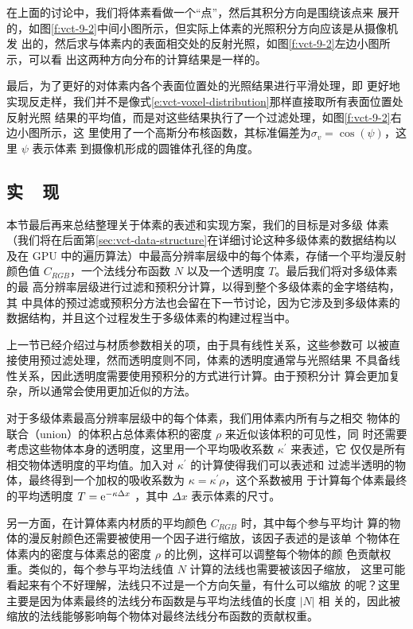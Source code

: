 在上面的讨论中，我们将体素看做一个“点”，然后其积分方向是围绕该点来 展开的，如图\ref{f:vct-9-2}中间小图所示，但实际上体素的光照积分方向应该是从摄像机发 出的，然后求与体素内的表面相交处的反射光照，如图\ref{f:vct-9-2}左边小图所示，可以看 出这两种方向分布的计算结果是一样的。

最后，为了更好的对体素内各个表面位置处的光照结果进行平滑处理，即 更好地实现反走样，我们并不是像式\ref{e:vct-voxel-distribution}那样直接取所有表面位置处反射光照 结果的平均值，而是对这些结果执行了一个过滤处理，如图\ref{f:vct-9-2}右边小图所示，这 里使用了一个高斯分布核函数，其标准偏差为$\sigma_v= \cos(\psi)$，这里 $\psi$ 表示体素 到摄像机形成的圆锥体孔径的角度。




\subsection{实~~现}\label{sec:vct-implementation}
本节最后再来总结整理关于体素的表述和实现方案，我们的目标是对多级 体素（我们将在后面第\ref{sec:vct-data-structure}在详细讨论这种多级体素的数据结构以及在 GPU 中的遍历算法）中最高分辨率层级中的每个体素，存储一个平均漫反射颜色值 $C_{RGB}$，一个法线分布函数 $N$ 以及一个透明度 $T$。最后我们将对多级体素的最 高分辨率层级进行过滤和预积分计算，以得到整个多级体素的金字塔结构，其 中具体的预过滤或预积分方法也会留在下一节讨论，因为它涉及到多级体素的 数据结构，并且这个过程发生于多级体素的构建过程当中。

上一节已经介绍过与材质参数相关的项，由于具有线性关系，这些参数可 以被直接使用预过滤处理，然而透明度则不同，体素的透明度通常与光照结果 不具备线性关系，因此透明度需要使用预积分的方式进行计算。由于预积分计 算会更加复杂，所以通常会使用更加近似的方法。

对于多级体素最高分辨率层级中的每个体素，我们用体素内所有与之相交 物体的联合（union）的体积占总体素体积的密度 $\rho$ 来近似该体积的可见性，同 时还需要考虑这些物体本身的透明度，这里用一个平均吸收系数 $\kappa^{'}$  来表述，它 仅仅是所有相交物体透明度的平均值。加入对 $\kappa^{'}$ 的计算使得我们可以表述和 过滤半透明的物体，最终得到一个加权的吸收系数为 $\kappa =\kappa^{'} \rho$，这个系数被用 于计算每个体素最终的平均透明度 $T = {\rm e}^{-\kappa\Delta x}$ ，其中 $\Delta x$ 表示体素的尺寸。

另一方面，在计算体素内材质的平均颜色 $C_{RGB}$ 时，其中每个参与平均计 算的物体的漫反射颜色还需要被使用一个因子进行缩放，该因子表述的是该单 个物体在体素内的密度与体素总的密度 $\rho$ 的比例，这样可以调整每个物体的颜 色贡献权重。类似的，每个参与平均法线值 $N$ 计算的法线也需要被该因子缩放， 这里可能看起来有个不好理解，法线只不过是一个方向矢量，有什么可以缩放 的呢？这里主要是因为体素最终的法线分布函数是与平均法线值的长度 $|N|$ 相 关的，因此被缩放的法线能够影响每个物体对最终法线分布函数的贡献权重。

